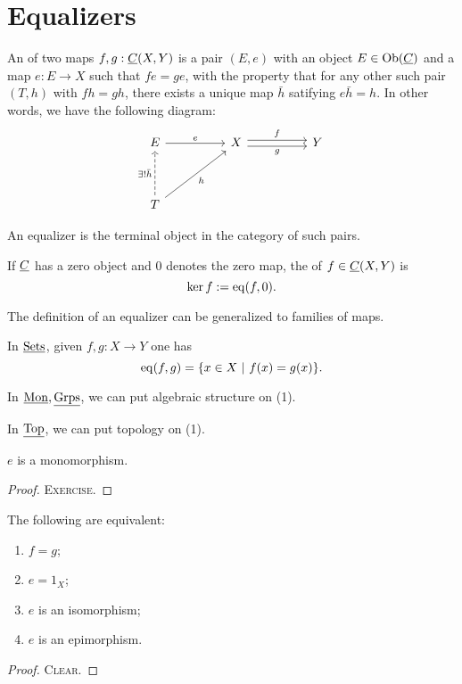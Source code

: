 \section{Equalizers}

\begin{definition*}
	An  of two maps \( f, g: \underline{C}(X, Y) \) is a pair \( (E, e) \) with an object \( E \in \operatorname{Ob}(\underline{C}) \) and a map \( e: E \to X \) such that \( fe = ge \), with the property that for any other such pair \( (T, h) \) with \( fh = gh \), there exists a unique map \( \bar{h} \) satifying \( e \bar{h} = h \). In other words, we have the following diagram:
	\[
		\begin{tikzcd}
			E && X && Y \\
			\\
			T
			\arrow["e", from=1-1, to=1-3]
			\arrow["f", shift left, from=1-3, to=1-5]
			\arrow["g"', shift right, from=1-3, to=1-5]
			\arrow["{\exists! \bar{h}}", dashed, from=3-1, to=1-1]
			\arrow["h"', from=3-1, to=1-3]
		\end{tikzcd}
	\]
\end{definition*}

\begin{remarks*}
	\item An equalizer is the terminal object in the category of such pairs.
	\item If \( \underline{C} \) has a zero object and \( 0 \) denotes the zero map, the  of \( f \in \underline{C}(X, Y) \) is
		\[
			\ker f := \operatorname{eq}(f, 0).
		\]
	\item The definition of an equalizer can be generalized to families of maps.
\end{remarks*}

\begin{examples*}
	\item In \( \underline{\mathrm{Sets}} \), given \( f, g: X \to Y \) one has
		\[
			\operatorname{eq}(f, g) = \{x \in X ~|~ f(x) = g(x)\}.
		\]
	\item In \( \underline{\mathrm{Mon}}, \underline{\mathrm{Grps}} \), we can put algebraic structure on (1).
	\item In \( \underline{\mathrm{Top}} \), we can put topology on (1).
\end{examples*}

\begin{proposition*}
	\( e \) is a monomorphism.
\end{proposition*}
\begin{proof}
	\textsc{Exercise}.
\end{proof}

\begin{proposition*}
	The following are equivalent:
	\begin{enumerate}
		\item \( f = g \);
		\item \( e = 1_X \);
		\item \( e \) is an isomorphism;
		\item \( e \) is an epimorphism.
	\end{enumerate}
\end{proposition*}
\begin{proof}
	\textsc{Clear}.
\end{proof}